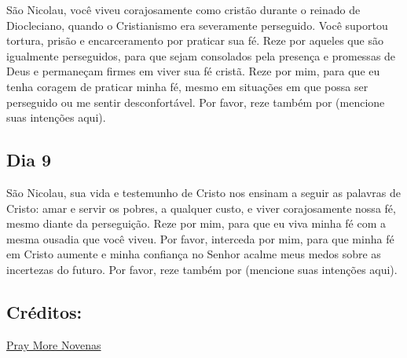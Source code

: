 \documentclass[11pt]{article}
\begin{document}
São Nicolau, você viveu corajosamente como cristão durante o reinado de Diocleciano, quando o Cristianismo era severamente perseguido. Você suportou tortura, prisão e encarceramento por praticar sua fé. Reze por aqueles que são igualmente perseguidos, para que sejam consolados pela presença e promessas de Deus e permaneçam firmes em viver sua fé cristã.  
Reze por mim, para que eu tenha coragem de praticar minha fé, mesmo em situações em que possa ser perseguido ou me sentir desconfortável.  
Por favor, reze também por (mencione suas intenções aqui).  

\vfill
\subsection{Dia 9}

\textbf{}

São Nicolau, sua vida e testemunho de Cristo nos ensinam a seguir as palavras de Cristo: amar e servir os pobres, a qualquer custo, e viver corajosamente nossa fé, mesmo diante da perseguição. Reze por mim, para que eu viva minha fé com a mesma ousadia que você viveu.  
Por favor, interceda por mim, para que minha fé em Cristo aumente e minha confiança no Senhor acalme meus medos sobre as incertezas do futuro.  
Por favor, reze também por (mencione suas intenções aqui).  


\subsection*{Créditos:}
\href{https://www.praymorenovenas.com/st-nicholas-novena}{ Pray More Novenas}
\end{document}
